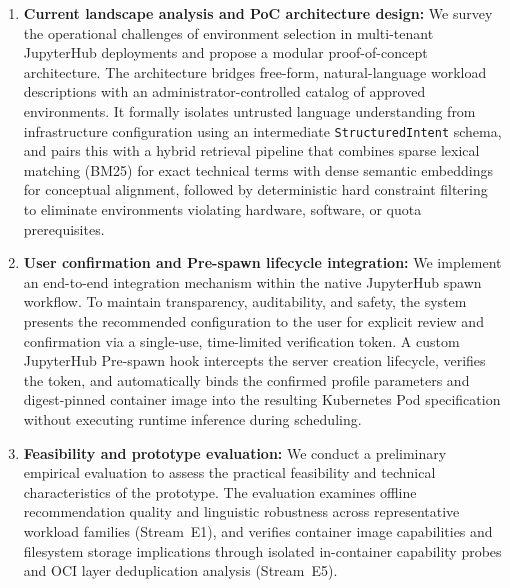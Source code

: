 \begin{enumerate}
    \item \textbf{Current landscape analysis and PoC architecture design:} We survey the operational challenges of environment selection in multi-tenant JupyterHub deployments and propose a modular proof-of-concept architecture. The architecture bridges free-form, natural-language workload descriptions with an administrator-controlled catalog of approved environments. It formally isolates untrusted language understanding from infrastructure configuration using an intermediate \texttt{StructuredIntent} schema, and pairs this with a hybrid retrieval pipeline that combines sparse lexical matching (BM25) for exact technical terms with dense semantic embeddings for conceptual alignment, followed by deterministic hard constraint filtering to eliminate environments violating hardware, software, or quota prerequisites.
    
    \item \textbf{User confirmation and Pre-spawn lifecycle integration:} We implement an end-to-end integration mechanism within the native JupyterHub spawn workflow. To maintain transparency, auditability, and safety, the system presents the recommended configuration to the user for explicit review and confirmation via a single-use, time-limited verification token. A custom JupyterHub Pre-spawn hook intercepts the server creation lifecycle, verifies the token, and automatically binds the confirmed profile parameters and digest-pinned container image into the resulting Kubernetes Pod specification without executing runtime inference during scheduling.
    
    \item \textbf{Feasibility and prototype evaluation:} We conduct a preliminary empirical evaluation to assess the practical feasibility and technical characteristics of the prototype. The evaluation examines offline recommendation quality and linguistic robustness across representative workload families (Stream~E1), and verifies container image capabilities and filesystem storage implications through isolated in-container capability probes and OCI layer deduplication analysis (Stream~E5).
\end{enumerate}

